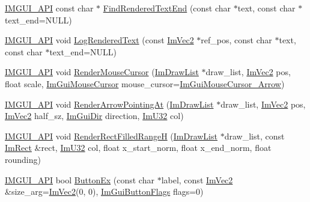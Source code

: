 \begin{DoxyCompactItemize}
\item 
\mbox{\hyperlink{imgui_8h_a43829975e84e45d1149597467a14bbf5}{I\+M\+G\+U\+I\+\_\+\+A\+PI}} const char $\ast$ \mbox{\hyperlink{namespace_im_gui_a7671e1dbc803a31b06081b52a771d83f}{Find\+Rendered\+Text\+End}} (const char $\ast$text, const char $\ast$text\+\_\+end=N\+U\+LL)
\item 
\mbox{\hyperlink{imgui_8h_a43829975e84e45d1149597467a14bbf5}{I\+M\+G\+U\+I\+\_\+\+A\+PI}} void \mbox{\hyperlink{namespace_im_gui_a7a0d62e33f2236ec2f789e24ca0fb56f}{Log\+Rendered\+Text}} (const \mbox{\hyperlink{struct_im_vec2}{Im\+Vec2}} $\ast$ref\+\_\+pos, const char $\ast$text, const char $\ast$text\+\_\+end=N\+U\+LL)
\item 
\mbox{\hyperlink{imgui_8h_a43829975e84e45d1149597467a14bbf5}{I\+M\+G\+U\+I\+\_\+\+A\+PI}} void \mbox{\hyperlink{namespace_im_gui_a01dc52b1969c6b3ae52fdd3228b377ad}{Render\+Mouse\+Cursor}} (\mbox{\hyperlink{struct_im_draw_list}{Im\+Draw\+List}} $\ast$draw\+\_\+list, \mbox{\hyperlink{struct_im_vec2}{Im\+Vec2}} pos, float scale, \mbox{\hyperlink{imgui_8h_a9223d6c82bb5d12c2eab5f829ca520ef}{Im\+Gui\+Mouse\+Cursor}} mouse\+\_\+cursor=\mbox{\hyperlink{imgui_8h_a2eb1181cc1d7872a061df8731141dde9ad0616df87319845990941ce7c9deb197}{Im\+Gui\+Mouse\+Cursor\+\_\+\+Arrow}})
\item 
\mbox{\hyperlink{imgui_8h_a43829975e84e45d1149597467a14bbf5}{I\+M\+G\+U\+I\+\_\+\+A\+PI}} void \mbox{\hyperlink{namespace_im_gui_af1ea568bffa58ec26100de3bf60af5f2}{Render\+Arrow\+Pointing\+At}} (\mbox{\hyperlink{struct_im_draw_list}{Im\+Draw\+List}} $\ast$draw\+\_\+list, \mbox{\hyperlink{struct_im_vec2}{Im\+Vec2}} pos, \mbox{\hyperlink{struct_im_vec2}{Im\+Vec2}} half\+\_\+sz, \mbox{\hyperlink{imgui_8h_a874086389bc27cc9647118d22a806403}{Im\+Gui\+Dir}} direction, \mbox{\hyperlink{imgui_8h_a118cff4eeb8d00e7d07ce3d6460eed36}{Im\+U32}} col)
\item 
\mbox{\hyperlink{imgui_8h_a43829975e84e45d1149597467a14bbf5}{I\+M\+G\+U\+I\+\_\+\+A\+PI}} void \mbox{\hyperlink{namespace_im_gui_af311762331bda4508b25e05f6afc7f45}{Render\+Rect\+Filled\+RangeH}} (\mbox{\hyperlink{struct_im_draw_list}{Im\+Draw\+List}} $\ast$draw\+\_\+list, const \mbox{\hyperlink{struct_im_rect}{Im\+Rect}} \&rect, \mbox{\hyperlink{imgui_8h_a118cff4eeb8d00e7d07ce3d6460eed36}{Im\+U32}} col, float x\+\_\+start\+\_\+norm, float x\+\_\+end\+\_\+norm, float rounding)
\item 
\mbox{\hyperlink{imgui_8h_a43829975e84e45d1149597467a14bbf5}{I\+M\+G\+U\+I\+\_\+\+A\+PI}} bool \mbox{\hyperlink{namespace_im_gui_ae479220c66b039874c6e4c9e9b22849f}{Button\+Ex}} (const char $\ast$label, const \mbox{\hyperlink{struct_im_vec2}{Im\+Vec2}} \&size\+\_\+arg=\mbox{\hyperlink{struct_im_vec2}{Im\+Vec2}}(0, 0), \mbox{\hyperlink{imgui__internal_8h_a990fae518aa1d95f571ee40989de4c22}{Im\+Gui\+Button\+Flags}} flags=0)

\end{DoxyCompactItemize}
